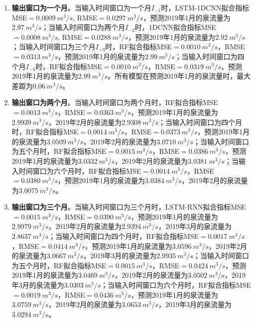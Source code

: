 \begin{enumerate}
    \begin{enumerate}
      \item \textbf{输出窗口为一个月}。当输入时间窗口为一个月$I_{-1}$时，LSTM-1DCNN拟合指标MSE$=\SI{0.0009}{m^{3}/s}$, RMSE$=\SI{0.0297}{m^{3}/s}$，预测2019年1月的泉流量为$\SI{2.97}{m^{3}/s}$；当输入时间窗口为两个月$I_{-2}$时，1DCNN拟合指标MSE$=\SI{0.0008}{m^{3}/s}$, RMSE$=\SI{0.0288}{m^{3}/s}$，预测2019年1月的泉流量为$\SI{2.92}{m^{3}/s}$；当输入时间窗口为三个月$I_{-3}$时，RF拟合指标MSE$=\SI{0.0010}{m^{3}/s}$，RMSE$=\SI{0.0313}{m^{3}/s}$，预测2019年1月的泉流量为$\SI{2.99}{m^{3}/s}$；当输入时间窗口为四个月$I_{-4}$时，RF拟合指标MSE$=\SI{0.0010}{m^{3}/s}$，RMSE$=\SI{0.0319}{m^{3}/s}$，预测2019年1月的泉流量为$\SI{2.99}{m^{3}/s}$。所有模型在预测2019年1月的泉流量时，最大差距为$\SI{0.06}{m^{3}/s}$。
      \item \textbf{输出窗口为两个月}。当输入时间窗口为两个月时，RF拟合指标MSE$=\SI{0.0013}{m^{3}/s}$，RMSE$=\SI{0.0363}{m^{3}/s}$，预测2019年1月的泉流量为$\SI{2.9939}{m^{3}/s}$，2019年2月的泉流量为$\SI{2.9308}{m^{3}/s}$；当输入时间窗口为四个月时，RF拟合指标MSE$=\SI{0.0014}{m^{3}/s}$，RMSE$=\SI{0.0373}{m^{3}/s}$，预测2019年1月的泉流量为$\SI{3.0509}{m^{3}/s}$，2019年2月的泉流量为$\SI{3.0710}{m^{3}/s}$；当输入时间窗口为五个月时，RF拟合指标MSE$=\SI{0.0015}{m^{3}/s}$，RMSE$=\SI{0.0386}{m^{3}/s}$，预测2019年1月的泉流量为$\SI{3.0332}{m^{3}/s}$，2019年2月的泉流量为$\SI{3.0381}{m^{3}/s}$；当输入时间窗口为六个月时，RF拟合指标MSE$=\SI{0.0014}{m^{3}/s}$，RMSE$=\SI{0.0380}{m^{3}/s}$，预测2019年1月的泉流量为$\SI{3.0384}{m^{3}/s}$，2019年2月的泉流量为$\SI{3.0075}{m^{3}/s}$。
      \item \textbf{输出窗口为三个月}。当输入时间窗口为三个月时，LSTM-RNN拟合指标MSE$=\SI{0.0015}{m^{3}/s}$，RMSE$=\SI{0.0390}{m^{3}/s}$，预测2019年1月的泉流量为$\SI{2.9979}{m^{3}/s}$，2019年2月的泉流量为$\SI{2.9394}{m^{3}/s}$，2019年3月的泉流量为$\SI{2.8637}{m^{3}/s}$；当输入时间窗口为四个月时，RF拟合指标MSE$=\SI{0.0017}{m^{3}/s}$，RMSE$=\SI{0.0414}{m^{3}/s}$，预测2019年1月的泉流量为$\SI{3.0596}{m^{3}/s}$，2019年2月的泉流量为$\SI{3.0667}{m^{3}/s}$，2019年3月的泉流量为$\SI{2.9935}{m^{3}/s}$；当输入时间窗口为五个月时，RF拟合指标MSE$=\SI{0.0015}{m^{3}/s}$，RMSE$=\SI{0.0424}{m^{3}/s}$，预测2019年1月的泉流量为$\SI{3.0469}{m^{3}/s}$，2019年2月的泉流量为$\SI{3.0502}{m^{3}/s}$，2019年3月的泉流量为$\SI{3.0303}{m^{3}/s}$；当输入时间窗口为六个月时，RF拟合指标MSE$=\SI{0.0019}{m^{3}/s}$，RMSE$=\SI{0.0436}{m^{3}/s}$，预测2019年1月的泉流量为$\SI{3.0759}{m^{3}/s}$，2019年2月的泉流量为$\SI{3.0653}{m^{3}/s}$，2019年3月的泉流量为$\SI{3.0294}{m^{3}/s}$。

\end{enumerate}
\end{enumerate}
